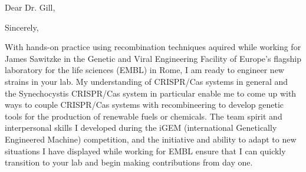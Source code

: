 \documentclass[11pt,a4paper,sans]{moderncv}
\begin{document}
\thispagestyle{titlepage}
\date{\today}
\opening{Dear Dr. Gill,}
\closing{Sincerely,}
\makelettertitle
\begin{spacing}{1.1}

With hands-on practice using recombination techniques aquired while working for James Sawitzke in the Genetic and Viral Engineering Facility of Europe's flagship laboratory for the life sciences (EMBL) in Rome, I am ready to engineer new strains in your lab. %
My understanding of CRISPR/Cas systems in general and the Synechocystis CRISPR/Cas system in particular enable me to come up with ways to couple CRISPR/Cas systems with recombineering to develop genetic tools for the production of renewable fuels or chemicals.
The team spirit and interpersonal skills I developed during the iGEM (international Genetically Engineered Machine) competition, and the initiative and ability to adapt to new situations I have displayed while working for EMBL ensure that I can quickly transition to your lab and begin making contributions from day one.\par\vspace*{3mm}


\end{spacing}
\end{document}
